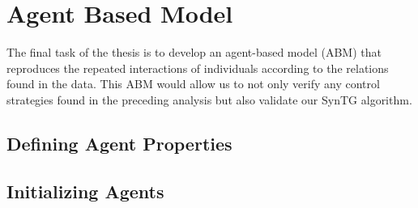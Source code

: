 \chapter{Agent Based Model}
\label{ch:abm}

The final task of the thesis is to develop an agent-based model (ABM) that reproduces the repeated interactions of individuals according to the relations found in the data. This ABM would allow us to not only verify any control strategies found in the preceding analysis but also validate our SynTG algorithm.

\section{Defining Agent Properties}
\label{sec:defining_agent_properties}

\section{Initializing Agents}
\label{sec:init_agents}